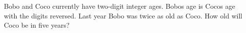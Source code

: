 Bobo and Coco currently have two-digit integer ages. Bobo\textquotesingle s age is Coco\textquotesingle s age with the digits reversed. Last year Bobo was twice as old as Coco. How old will Coco be in five years?
